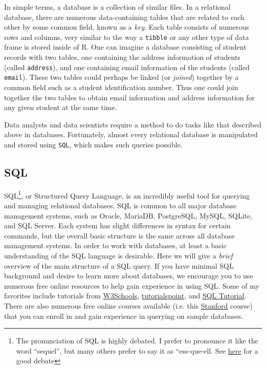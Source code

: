 \documentclass[12pt,oneside]{book}\usepackage[]{graphicx}\usepackage[]{color}
\begin{document}
{{{{In simple terms, a database is a collection of similar files. In a relational database, there are numerous data-containing tables that are related to each other by some common field, known as a \emph{key}. Each table consists of numerous rows and columns, very similar to the way a \verb+tibble+ or any other type of data frame is stored inside of R. One can imagine a database consisting of student records with two tables, one containing the address information of students (called \verb+address+), and one containing email information of the students (called \verb+email+). These two tables could perhaps be linked (or \emph{joined}) together by a common field such as a student identification number. Thus one could join together the two tables to obtain email information and address information for any given student at the same time.

Data analysts and data scientists require a method to do tasks like that described above in databases. Fortunately, almost every relational database is manipulated and stored using \verb+SQL+, which makes such queries possible. 

\subsection{SQL}

SQL\footnote{The pronunciation of SQL is highly debated. I prefer to pronounce it like the word ``sequel'', but many others prefer to say it as ``ess-que-ell. See \href{https://softwareengineering.stackexchange.com/questions/8588/whats-the-history-of-the-non-official-pronunciation-of-sql}{here} for a good debate}, or Structured Query Language, is an incredibly useful tool for querying and managing relational databases. SQL is common to all major database management systems, such as Oracle, MariaDB, PostgreSQL, MySQL, SQLite, and SQL Server. Each system has slight differences in syntax for certain commands, but the overall basic structure is the same across all database management systems. In order to work with databases, at least a basic understanding of the SQL language is desirable. Here we will give a \emph{brief} overview of the main structure of a SQL query. If you have minimal SQL background and desire to learn more about databases, we encourage you to use numerous free online resources to help gain experience in using SQL. Some of my favorites include tutorials from \href{https://www.w3schools.com/sql/}{W3Schools}, \href{https://www.tutorialspoint.com/sql/index.htm}{tutorialspoint}, and \href{http://www.sqltutorial.org/}{SQL Tutorial}. There are also numerous free online courses available (i.e. this \href{https://lagunita.stanford.edu/courses/Engineering/db/2014\_1/about}{Stanford} course) that you can enroll in and gain experience in querying on sample databases. 

}}}}
\end{document}
